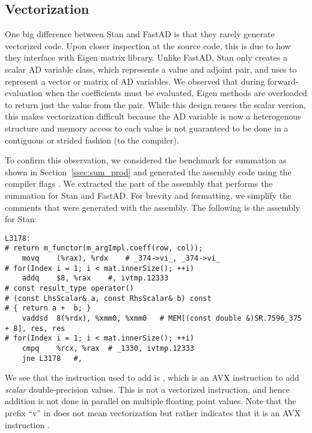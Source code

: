 \subsection{Vectorization}

One big difference between Stan and FastAD is that 
they rarely generate vectorized code.
Upon closer inspection at the source code, 
this is due to how they interface with Eigen matrix library.
Unlike FastAD, Stan only creates a scalar AD variable class,
which represents a value and adjoint pair,
and uses 
to represent a vector or matrix of AD variables.
We observed that during forward-evaluation when the coefficients must be evaluated,
Eigen methods are overloaded to return just the value from the pair.
While this design reuses the scalar version,
this makes vectorization difficult because the AD variable
is now a heterogenous structure and memory access to each value
is not guaranteed to be done in a contiguous or strided fashion
(to the compiler).

To confirm this observation, we considered the
benchmark for summation as shown in Section~\ref{ssec:sum_prod}
and generated the assembly code using the compiler flags .
We extracted the part of the assembly that performs the summation for Stan and FastAD.\@
For brevity and formatting, 
we simplify the comments that were generated with the assembly.
The following is the assembly for Stan:
\begin{lstlisting}[style=customasm]
L3178:
# return m_functor(m_argImpl.coeff(row, col));
    movq    (%rax), %rdx    # _374->vi_, _374->vi_
# for(Index i = 1; i < mat.innerSize(); ++i)
    addq    $8, %rax    #, ivtmp.12333
# const result_type operator() 
# (const LhsScalar& a, const RhsScalar& b) const 
# { return a +  b; }
    vaddsd  8(%rdx), %xmm0, %xmm0   # MEM[(const double &)SR.7596_375 + 8], res, res
# for(Index i = 1; i < mat.innerSize(); ++i)
    cmpq    %rcx, %rax  # _1330, ivtmp.12333
    jne L3178   #,
\end{lstlisting}
We see that the instruction used to add is ,
which is an AVX instruction to add \emph{scalar} double-precision values.
This is not a vectorized instruction, and hence addition is not done in parallel
on multiple floating point values.
Note that the prefix ``v'' in  does not mean vectorization but 
rather indicates that it is an AVX instruction .

